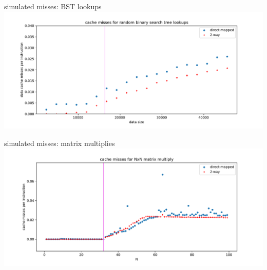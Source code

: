 \begin{frame}{simulated misses: BST lookups}
\includegraphics[width=\textwidth]{../caching/bst-both}
\end{frame}

\begin{frame}{simulated misses: matrix multiplies}
\includegraphics[width=\textwidth]{../caching/mm-both}
\end{frame}
